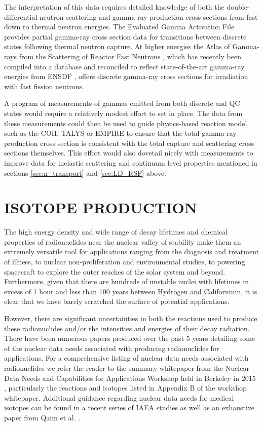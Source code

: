\documentclass[letterpaper]{ar-1col}
\begin{document}
The interpretation of this data requires detailed knowledge of both the double-differential neutron scattering and gamma-ray production cross sections from fast down to thermal neutron energies.
 The Evaluated Gamma Activation File \cite{Fir15} provides partial gamma-ray cross section data for transitions between discrete states following thermal neutron capture.
 At higher energies the Atlas of Gamma-rays from the Scattering of Reactor Fast Neutrons \cite{Dem78}, which has recently been compiled into a database and reconciled to reflect state-of-the-art gamma-ray energies from ENSDF \cite{Hur18}, offers discrete gamma-ray cross sections for irradiation with fast fission neutrons.
 

A program of measurements of gammas emitted from both discrete and QC states would require a relatively modest effort to set in place.
 The data from these measurements could then be used to guide physics-based reaction model, such as the COH, TALYS or EMPIRE to ensure that the total gamma-ray production cross section is consistent with the total capture and scattering cross sections themselves.  This effort would also dovetail nicely with measurements to improve data for inelastic scattering and continuum level properties mentioned in sections \autoref{sec:n_transport} and \autoref{sec:LD_RSF} above.  



\section{ISOTOPE PRODUCTION}\label{sec:isotope_production}


The high energy density and wide range of decay lifetimes and chemical properties of radionuclides near the nuclear valley of stability make them an extremely versatile tool for applications ranging from the diagnosis and treatment of illness, to nuclear non-proliferation and environmental studies, to powering spacecraft to explore the outer reaches of the solar system and beyond.
Furthermore, given that there are hundreds of unstable nuclei with lifetimes in excess of 1 hour and less than 100 years between Hydrogen and Californium, it is clear that we have barely scratched the surface of potential applications.

However, there are significant uncertainties in both the reactions used to produce these radionuclides and/or the intensities and energies of their decay radiation.
 There have been numerous papers produced over the past 5 years detailing some of the nuclear data needs associated with producing radionuclides for applications.
For a comprehensive listing of nuclear data needs associated with radionuclides we refer the reader to the summary whitepaper from the Nuclear Data Needs and Capabilities for Applications Workshop held in Berkeley in 2015 \cite{bernstein2015nuclear}, particularly the reactions and isotopes listed in Appendix B of the workshop whitepaper.
 Additional guidance regarding nuclear data needs for medical isotopes can be found in a recent series of IAEA studies \cite{Iae675,Iae596,Iae591} as well as an exhaustive paper from Qaim et al. \cite{Qaim201731}.
\end{document}
